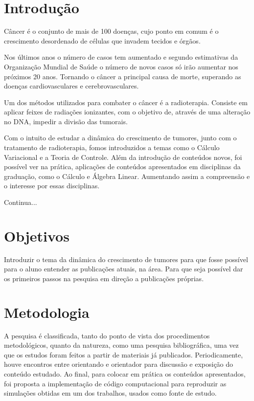 \documentclass[12pt, a4paper]{article}
\makeatletter
\renewcommand\tableofcontents{
  \null\hfill\textbf{\Large\contentsname}\hfill\null\par
  \@mkboth{\MakeUppercase\contentsname}{\MakeUppercase\contentsname}
  \@starttoc{toc}
}
\makeatother
\begin{document}
 
 \begin{flushleft}
 
\tableofcontents 


\end{flushleft}
\newpage

\section{ Introdução}

Câncer é o conjunto de mais de 100 doenças, cujo ponto em comum é o crescimento desordenado de células que invadem tecidos e órgãos.\

Nos últimos anos o número de casos tem aumentado e segundo estimativas da Organização Mundial de Saúde o número de novos casos só irão aumentar nos próximos 20 anos. Tornando o câncer a principal causa de morte, superando as doenças cardiovasculares e cerebrovasculares. \

Um dos métodos utilizados para combater o câncer é a radioterapia. Consiste em aplicar feixes de radiações ionizantes, com o objetivo de, através de uma alteração no DNA, impedir a divisão das  tumorais.\

Com o intuito de estudar a dinâmica do crescimento de tumores, junto com o tratamento de radioterapia, fomos introduzidos a temas como o Cálculo Variacional e a Teoria de Controle. Além da introdução de conteúdos novos, foi possível ver na prática, aplicações de conteúdos apresentados em disciplinas da graduação, como o Cálculo e Álgebra Linear. Aumentando assim a compreensão e o interesse por essas disciplinas.\

Continua...

\newpage

\section{Objetivos}
Introduzir o tema da dinâmica do crescimento de tumores para que fosse possível para o aluno entender as publicações atuais, na área. Para que seja possível dar os primeiros passos na pesquisa em direção a publicações próprias.

\newpage

\section{Metodologia}

A pesquisa é classificada, tanto do ponto de vista dos procedimentos metodológicos, quanto da natureza, como uma pesquisa bibliográfica, uma vez que os estudos foram feitos a partir de materiais já publicados. Periodicamente, houve encontros entre orientando e orientador para discussão e exposição do conteúdo estudado. Ao final, para colocar em prática os conteúdos apresentados, foi proposta a implementação de código computacional para reproduzir as simulações obtidas em um dos trabalhos, usados como fonte de estudo.
\cite{Burns2014}
\newpage
\end{document}
